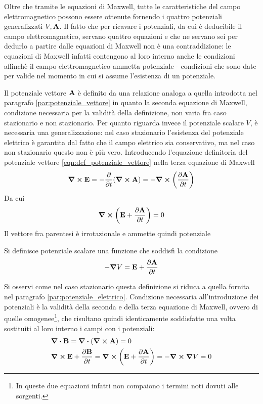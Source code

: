 Oltre che tramite le equazioni di Maxwell, tutte le caratteristiche del campo elettromagnetico possono essere ottenute fornendo i
quattro potenziali generalizzati $V,\vb{A}$. Il fatto che per ricavare i potenziali, da cui è deducibile il campo elettromagnetico,
servano quattro equazioni e che ne servano sei per dedurlo a partire dalle equazioni di Maxwell non è una contraddizione: le
equazioni di Maxwell infatti contengono al loro interno anche le condizioni affinchè il campo elettromagnetico ammetta potenziale
- condizioni che sono date per valide nel momento in cui si assume l'esistenza di un potenziale.

Il potenziale vettore $\vb{A}$ è definito da una relazione analoga a quella introdotta nel paragrafo \ref{par:potenziale_vettore}
in quanto la seconda equazione di Maxwell, condizione necessaria per la validità della definizione,
non varia fra caso stazionario e non stazionario. Per quanto riguarda invece il potenziale scalare
$V$, è necessaria una generalizzazione: nel caso stazionario l'esistenza del potenziale elettrico è garantita dal fatto che il
campo elettrico sia conservativo, ma nel caso non stazionario questo non è più vero.
Introducendo l'equazione definitoria del potenziale vettore \eqref{eqn:def_potenziale_vettore}
nella terza equazione di Maxwell
\[
    \curl{\vb{E}}=-\pdv{t}(\curl{\vb{A}})=-\curl(\pdv{\vb{A}}{t})
\]
Da cui
\[
    \curl(\vb{E}+\pdv{\vb{A}}{t})=0
\]
Il vettore fra parentesi è irrotazionale e ammette quindi potenziale
\begin{defn}
    Si definisce potenziale scalare una funzione che soddisfi la condizione
    \begin{equation}
        \label{eqn:def_potenziale_scalare}
        -\grad{V}=\vb{E}+\pdv{\vb{A}}{t}
    \end{equation}
\end{defn}
Si osservi come nel caso stazionario questa definizione si riduca a quella fornita nel paragrafo \ref{par:potenziale_elettrico}.
Condizione necessaria all'introduzione dei potenziali è la validità della seconda e della terza equazione di
Maxwell, ovvero di quelle omogenee\footnote{In queste due equazioni infatti non compaiono i termini noti dovuti
alle sorgenti.}, che risultano quindi identicamente soddisfatte una volta sostituiti al loro interno i
campi con i potenziali:
\[
    \begin{split}
        &\div{\vb{B}}=\div(\curl{\vb{A}})=0\\
        &\curl{\vb{E}}+\pdv{\vb{B}}{t}=\curl(\vb{E}+\pdv{\vb{A}}{t})=-\curl{\grad{V}}=0
    \end{split}
\]
